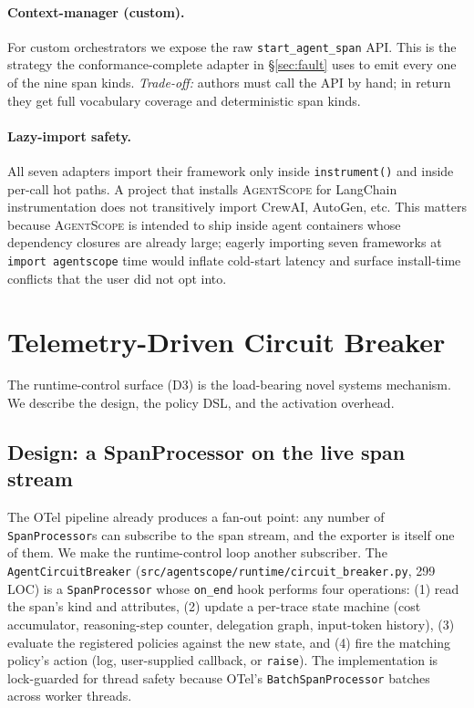 \documentclass[sigplan,10pt,anonymous,review]{acmart}
\newcommand{\sysname}{\textsc{AgentScope}\xspace}
\begin{document}
\paragraph{Context-manager (custom).} For custom orchestrators we
expose the raw \texttt{start\_agent\_span} API. This is the strategy
the conformance-complete adapter in \S\ref{sec:fault} uses to emit
every one of the nine span kinds. \emph{Trade-off:} authors must call
the API by hand; in return they get full vocabulary coverage and
deterministic span kinds.

\paragraph{Lazy-import safety.} All seven adapters import their
framework only inside \texttt{instrument()} and inside per-call hot
paths. A project that installs \sysname for LangChain instrumentation
does not transitively import CrewAI, AutoGen, etc. This matters because
\sysname is intended to ship inside agent containers whose dependency
closures are already large; eagerly importing seven frameworks at
\texttt{import agentscope} time would inflate cold-start latency
and surface install-time conflicts that the user did not opt into.

\section{Telemetry-Driven Circuit Breaker}
\label{sec:circuitbreaker}

The runtime-control surface (D3) is the load-bearing novel systems
mechanism. We describe the design, the policy DSL, and the activation
overhead.

\subsection{Design: a SpanProcessor on the live span stream}

The OTel pipeline already produces a fan-out point: any number of
\texttt{SpanProcessor}s can subscribe to the span stream, and the
exporter is itself one of them. We make the runtime-control loop
another subscriber. The \texttt{AgentCircuitBreaker}
(\texttt{src/agentscope/runtime/circuit\_breaker.py}, 299 LOC) is a
\texttt{SpanProcessor} whose \texttt{on\_end} hook performs four
operations: (1) read the span's kind and attributes, (2) update a
per-trace state machine (cost accumulator, reasoning-step counter,
delegation graph, input-token history), (3) evaluate the registered
policies against the new state, and (4) fire the matching policy's
action (log, user-supplied callback, or \texttt{raise}). The
implementation is lock-guarded for thread safety because OTel's
\texttt{BatchSpanProcessor} batches across worker threads.
\end{document}
